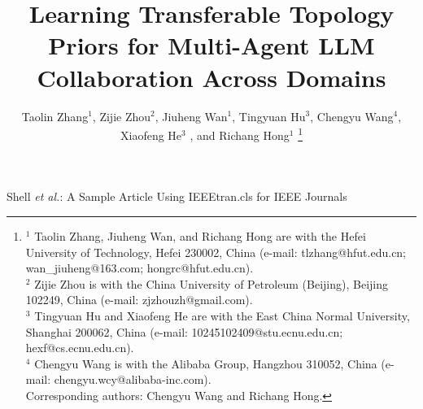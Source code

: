 \documentclass[lettersize,journal]{IEEEtran}
\theoremstyle{plain}
\begin{document}
\title{Learning Transferable Topology Priors for Multi-Agent LLM Collaboration Across Domains}


\author{
    Taolin Zhang$^{1}$,
    Zijie Zhou$^2$,
    Jiuheng Wan$^{1}$,
    Tingyuan Hu$^3$,
    Chengyu Wang$^4$,
    Xiaofeng He$^3$ ,
    and Richang Hong$^1$ 
\thanks{
    $^1$ Taolin Zhang, Jiuheng Wan, and Richang Hong are with the Hefei University of Technology, Hefei 230002, China (e-mail: tlzhang@hfut.edu.cn; wan\_jiuheng@163.com; hongrc@hfut.edu.cn).\\
    $^2$ Zijie Zhou is with the China University of Petroleum (Beijing), Beijing 102249, China (e-mail: zjzhouzh@gmail.com).\\
    $^3$ Tingyuan Hu and Xiaofeng He are with the East China Normal University, Shanghai 200062, China (e-mail: 10245102409@stu.ecnu.edu.cn; hexf@cs.ecnu.edu.cn).\\
    $^4$ Chengyu Wang is with the Alibaba Group, Hangzhou 310052, China (e-mail: chengyu.wcy@alibaba-inc.com). \\
    Corresponding authors: Chengyu Wang and Richang Hong.}
}

%
{Shell \MakeLowercase{\textit{et al.}}: A Sample Article Using IEEEtran.cls for IEEE Journals}
\end{document}

